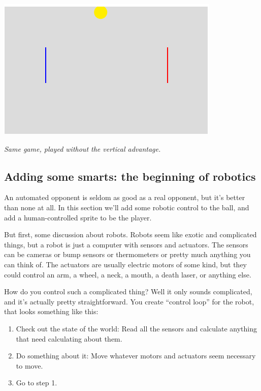 \documentclass[11pt]{article}
\newcommand{\capt}[1]{\begin{minipage}{0.75\columnwidth}\itshape#1\end{minipage}}
\begin{document}
\begin{enumerate}
\begin{center}
\includegraphics[height=0.5\columnwidth]{game-sideways.png}

\capt{Same game, played without the vertical advantage.}
\end{center}

\end{enumerate}


\subsection{Adding some smarts: the beginning of robotics}

An automated opponent is seldom as good as a real opponent, but it's
better than none at all.  In this section we'll add some robotic
control to the ball, and add a human-controlled sprite to be the
player.

But first, some discussion about robots.  Robots seem like exotic and
complicated things, but a robot is just a computer with sensors and
actuators.  The sensors can be cameras or bump sensors or thermometers
or pretty much anything you can think of.  The actuators are usually
electric motors of some kind, but they could control an arm, a wheel,
a neck, a mouth, a death laser, or anything else.

How do you control such a complicated thing?  Well it only sounds
complicated, and it's actually pretty straightforward.  You create
``control loop'' for the robot, that looks something like this:

\begin{enumerate}

\item Check out the state of the world:  Read all the sensors and
  calculate anything that need calculating about them.

\item Do something about it:  Move whatever motors and  actuators seem
  necessary to move.

\item Go to step 1.
\end{enumerate}
\end{document}
